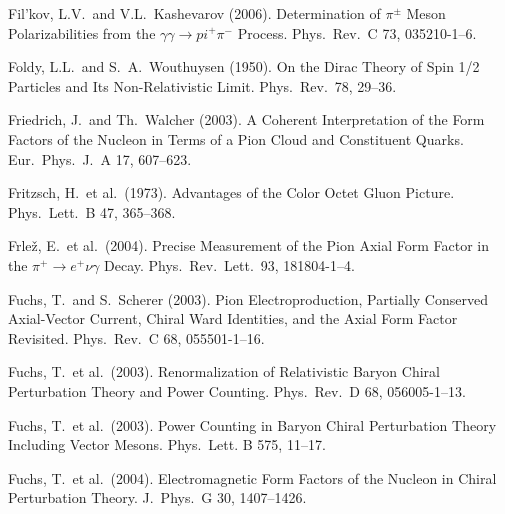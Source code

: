 \documentclass[twoside,12pt]{article}
\begin{document}
\begin{thebibliography}{}
Fil'kov, L.V.~and V.L.~Kashevarov (2006).
Determination of $\pi^\pm$ Meson Polarizabilities from the $\gamma \gamma \to pi^+
\pi^-$  Process.
Phys.\ Rev.\  C 73, 035210-1--6.

Foldy, L.L.~and S.~A.~Wouthuysen (1950).
On the Dirac Theory of Spin 1/2 Particles and Its Non-Relativistic Limit.
Phys.\ Rev.\  78, 29--36.

Friedrich, J.~and Th.~Walcher (2003).
A Coherent Interpretation of the Form Factors of the Nucleon in Terms of a
Pion Cloud and Constituent Quarks.
Eur.\ Phys.\ J.\  A 17, 607--623.

Fritzsch, H.~et al.~(1973).
Advantages of the Color Octet Gluon Picture.
Phys.\ Lett.\ B 47, 365--368.

Frle\v{z}, E.~et al.~(2004).
Precise Measurement of the Pion Axial Form Factor in the $\pi^+\to e^+ \nu \gamma$
Decay.
Phys.\ Rev.\ Lett.\  93, 181804-1--4.

Fuchs, T.~and S.~Scherer (2003).
Pion Electroproduction, Partially Conserved Axial-Vector Current,
Chiral Ward Identities, and the Axial Form Factor Revisited.
Phys.\ Rev.\  C 68, 055501-1--16.

Fuchs, T.~et al.~(2003).
Renormalization of Relativistic Baryon Chiral Perturbation Theory and
Power Counting.
Phys.\ Rev.\  D 68, 056005-1--13.

Fuchs, T.~et al.~(2003).
Power Counting in Baryon Chiral Perturbation Theory Including Vector Mesons.
Phys.\ Lett.  B 575, 11--17.

Fuchs, T.~et al.~(2004).
Electromagnetic Form Factors of the Nucleon in Chiral
Perturbation Theory.
J.\ Phys.\ G 30, 1407--1426.


\end{thebibliography}
\end{document}
